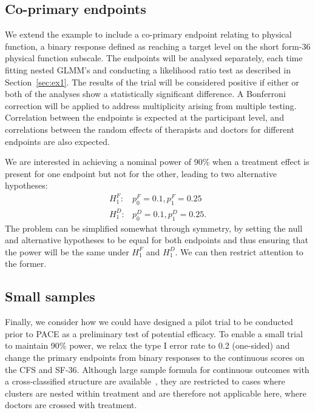 \documentclass{article} %
\begin{document}
\subsection{Co-primary endpoints}\label{sec:ex2}

We extend the example to include a co-primary endpoint relating to physical function, a binary response defined as reaching a target level on the short form-36 physical function subscale. The endpoints will be analysed separately, each time fitting nested GLMM's and conducting a likelihood ratio test as described in Section~\ref{sec:ex1}. The results of the trial will be considered positive if either or both of the analyses show a statistically significant difference. A Bonferroni correction will be applied to address multiplicity arising from multiple testing. Correlation between the endpoints is expected at the participant level, and correlations between the random effects of therapists and doctors for different endpoints are also expected.

We are interested in achieving a nominal power of 90\% when a treatment effect is present for one endpoint but not for the other, leading to two alternative hypotheses:
\begin{align}
H_1^F: & p_0^F=0.1, p_1^F=0.25 \\
H_1^D: & p_0^D=0.1, p_1^D=0.25.
\end{align}
The problem can be simplified somewhat through symmetry, by setting the null and alternative hypotheses to be equal for both endpoints and thus ensuring that the power will be the same under $H_1^F$ and $H_1^D$. We can then restrict attention to the former.

\subsection{Small samples}\label{sec:ex3}

Finally, we consider how we could have designed a pilot trial to be conducted prior to PACE as a preliminary test of potential efficacy. To enable a small trial to maintain 90\% power, we relax the type I error rate to 0.2 (one-sided) and change the primary endpoints from binary responses to the continuous scores on the CFS and SF-36. Although large sample formula for continuous outcomes with a cross-classified structure are available~\cite{Roberts2013}, they are restricted to cases where clusters are nested within treatment and are therefore not applicable here, where doctors are crossed with treatment.
\end{document}
